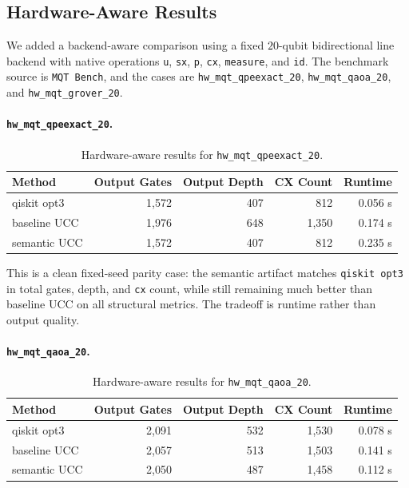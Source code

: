 \documentclass[11pt]{article}
\begin{document}
\subsection{Hardware-Aware Results}

We added a backend-aware comparison using a fixed $20$-qubit bidirectional line backend with native operations \texttt{u}, \texttt{sx}, \texttt{p}, \texttt{cx}, \texttt{measure}, and \texttt{id}. The benchmark source is \texttt{MQT Bench}, and the cases are \texttt{hw\_mqt\_qpeexact\_20}, \texttt{hw\_mqt\_qaoa\_20}, and \texttt{hw\_mqt\_grover\_20}.

\paragraph{\texttt{hw\_mqt\_qpeexact\_20}.}
\begin{table}[h]
\centering
\begin{tabular}{lrrrr}
\toprule
Method & Output Gates & Output Depth & CX Count & Runtime \\
\midrule
qiskit opt3 & 1{,}572 & 407 & 812 & 0.056 s \\
baseline UCC & 1{,}976 & 648 & 1{,}350 & 0.174 s \\
semantic UCC & 1{,}572 & 407 & 812 & 0.235 s \\
\bottomrule
\end{tabular}
\caption{Hardware-aware results for \texttt{hw\_mqt\_qpeexact\_20}.}
\label{tab:hw-qpe}
\end{table}

This is a clean fixed-seed parity case: the semantic artifact matches
\texttt{qiskit opt3} in total gates, depth, and \texttt{cx} count, while still
remaining much better than baseline UCC on all structural metrics. The tradeoff
is runtime rather than output quality.

\paragraph{\texttt{hw\_mqt\_qaoa\_20}.}
\begin{table}[h]
\centering
\begin{tabular}{lrrrr}
\toprule
Method & Output Gates & Output Depth & CX Count & Runtime \\
\midrule
qiskit opt3 & 2{,}091 & 532 & 1{,}530 & 0.078 s \\
baseline UCC & 2{,}057 & 513 & 1{,}503 & 0.141 s \\
semantic UCC & 2{,}050 & 487 & 1{,}458 & 0.112 s \\
\bottomrule
\end{tabular}
\caption{Hardware-aware results for \texttt{hw\_mqt\_qaoa\_20}.}
\label{tab:hw-qaoa}
\end{table}
\end{document}
